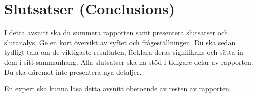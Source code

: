 \section{Slutsatser (Conclusions)}

I detta avsnitt ska du summera rapporten samt presentera slutsatser och slutanalys. Ge en kort översikt av syftet och frågeställningen. Du ska sedan tydligt tala om de viktigaste resultaten, förklara deras signifikans och sätta in dem i sitt sammanhang. Alla slutsatser ska ha stöd i tidigare delar av rapporten.  Du ska däremot inte presentera nya detaljer. 

En expert ska kunna läsa detta avsnitt oberoende av resten av rapporten. 
